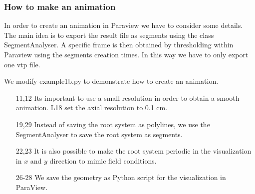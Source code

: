

\subsubsection*{How to make an animation} \label{ssec:animation}

In order to create an animation in Paraview we have to consider some details. The main idea is to export the result file as segments using the class SegmentAnalyser. A specific frame is then obtained by thresholding within Paraview using the segments creation times. In this way we have to only export one vtp file. 

We modify example1b.py to demonstrate how to create an animation.

 

\begin{itemize}

\item[11,12] Its important to use a small resolution in order to obtain a smooth animation. L18 set the axial resolution to 0.1 cm. 

\item[19,29] Instead of saving the root system as polylines, we use the SegmentAnalyser to save the root system as segments.

\item[22,23] It is also possible to make the root system periodic in the visualization in $x$ and $y$ direction to mimic field conditions.

\item[26-28] We save the geometry as Python script for the visualization in ParaView.

\end{itemize}

